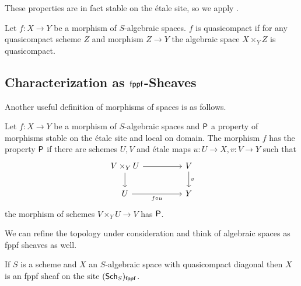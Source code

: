 \begin{remark}
    These properties are in fact stable on the \'{e}tale site, so we apply .
\end{remark}
\begin{definition}\label{def: quasicompact morphism of algebraic spaces}
    Let $f:X\to Y$ be a morphism of $S$-algebraic spaces. $f$ is quasicompact if for any quasicompact scheme $Z$ and morphism $Z\to Y$ the algebraic space $X\times_{Y}Z$ is quasicompact. 
\end{definition}
\subsection{Characterization as $\mathsf{fppf}$-Sheaves}
Another useful definition of morphisms of spaces is as follows. 
\begin{definition}\label{def: property of spaces via schemes}
    Let $f:X\to Y$ be a morphism of $S$-algebraic spaces and $\mathsf{P}$ a property of morphisms stable on the \'{e}tale site and local on domain. The morphism $f$ has the property $\mathsf{P}$ if there are schemes $U,V$ and \'{e}tale maps $u:U\to X, v:V\to Y$ such that 
    $$%
    \begin{tikzcd}
        {V\times_{Y}U} && V \\
        U && Y
        \arrow["{f\circ u}"', from=2-1, to=2-3]
        \arrow["v", from=1-3, to=2-3]
        \arrow[from=1-1, to=2-1]
        \arrow[from=1-1, to=1-3]
    \end{tikzcd}$$
    the morphism of schemes $V\times_{Y}U\to V$ has $\mathsf{P}$.
\end{definition}
We can refine the topology under consideration and think of algebraic spaces as fppf sheaves as well. 
\begin{theorem}\label{thm: spaces are fppf sheaves}
    If $S$ is a scheme and $X$ an $S$-algebraic space with quasicompact diagonal then $X$ is an fppf sheaf on the site $(\mathsf{Sch}_{S})_{\mathsf{fppf}}$.
\end{theorem}
